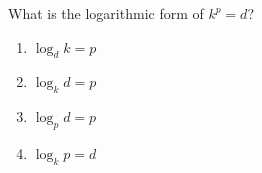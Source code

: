 \bigskip

\item What is the logarithmic form of $k^p=d$?

    \begin{enumerate}
    \item $\log_d k=p$
    \item $\log_k d=p$
    \item $\log_p d=p$
    \item $\log_k p=d$
    \end{enumerate}

